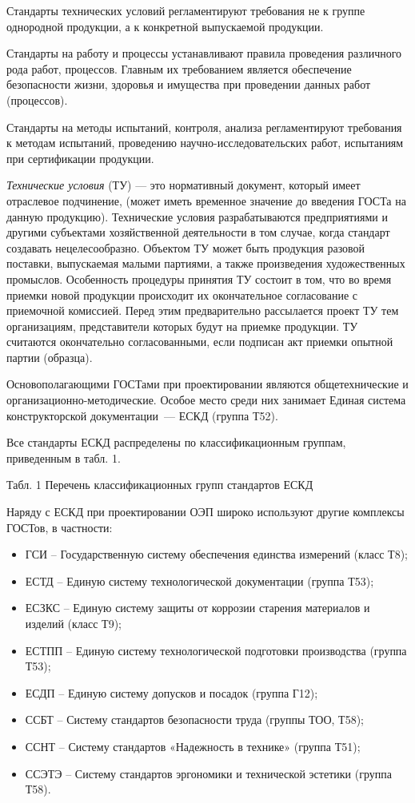 Стандарты технических условий регламентируют требования не к группе однородной продукции, а к конкретной выпускаемой продукции.

Стандарты на работу и процессы устанавливают правила проведения различного рода работ, процессов. Главным их требованием является обеспечение безопасности жизни, здоровья и имущества при проведении данных работ (процессов).

Стандарты на методы испытаний, контроля, анализа регламентируют требования к методам испытаний, проведению научно-исследовательских работ, испытаниям при сертификации продукции.

\textit{Технические условия} (ТУ) --- это нормативный документ, который имеет отраслевое подчинение, (может иметь временное значение до введения ГОСТа на данную продукцию). Технические условия  разрабатываются предприятиями и другими субъектами хозяйственной деятельности в том случае, когда стандарт создавать нецелесообразно. Объектом ТУ может быть продукция разовой поставки, выпускаемая малыми партиями, а также произведения художественных промыслов. Особенность процедуры принятия ТУ состоит в том, что во время приемки новой продукции происходит их окончательное согласование с приемочной комиссией. Перед этим предварительно рассылается проект ТУ тем организациям, представители которых будут на приемке продукции. ТУ считаются окончательно согласованными, если подписан акт приемки опытной партии (образца).

Основополагающими ГОСТами при проектировании являются общетехнические и ор\-га\-ни\-за\-ци\-он\-но-методические. Особое место среди них занимает Единая система конструкторской документации~--- ЕСКД (группа Т52).

Все стандарты ЕСКД распределены по классификационным группам, приведенным в табл. 1.

Табл. 1
Перечень классификационных групп стандартов ЕСКД


Наряду с ЕСКД при проектировании ОЭП широко используют другие комплексы ГОСТов, в частности:
\begin{itemize}
\item ГСИ -- Государственную систему обеспечения единства измерений (класс Т8);
\item ЕСТД -- Единую систему технологической документации (группа Т53);
\item ЕСЗКС -- Единую систему защиты от коррозии старения материалов и изделий (класс Т9);
\item ЕСТПП -- Единую систему технологической подготовки производства (группа Т53);
\item ЕСДП -- Единую систему допусков и посадок (группа Г12);
\item ССБТ -- Систему стандартов безопасности труда (группы ТОО, Т58);
\item ССНТ -- Систему стандартов «Надежность в технике» (группа Т51);
\item ССЭТЭ -- Систему стандартов эргономики и технической эстетики (группа Т58).
\end{itemize}


